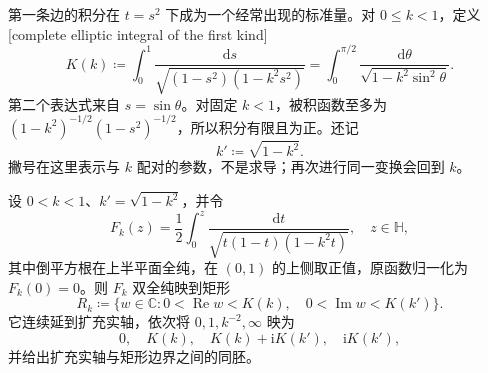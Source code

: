 第一条边的积分在 \(t=s^2\) 下成为一个经常出现的标准量。对 \(0\le k<1\)，定义[complete elliptic integral of the first kind]
\[
 K(k)\coloneqq\int_0^1
 \frac{\mathrm{d}s}{\sqrt{(1-s^2)(1-k^2s^2)}}
 =\int_0^{\pi/2}\frac{\mathrm{d}\theta}
 {\sqrt{1-k^2\sin^2\theta}}.
\]
第二个表达式来自 \(s=\sin\theta\)。对固定 \(k<1\)，被积函数至多为
\((1-k^2)^{-1/2}(1-s^2)^{-1/2}\)，所以积分有限且为正。还记
\[
 k'\coloneqq\sqrt{1-k^2}.
\]
撇号在这里表示与 \(k\) 配对的参数，不是求导；再次进行同一变换会回到 \(k\)。

\begin{proposition}[椭圆积分与矩形]\label{b3:prop:07-elliptic-rectangle}
设 \(0<k<1\)、\(k'=\sqrt{1-k^2}\)，并令
\[
 F_k(z)=\frac12\int_0^z
 \frac{\mathrm{d}t}{\sqrt{t(1-t)(1-k^2t)}},\quad z\in\mathbb H,
\]
其中倒平方根在上半平面全纯，在 \((0,1)\) 的上侧取正值，原函数归一化为 \(F_k(0)=0\)。则 \(F_k\) 双全纯映到矩形
\[
 R_k\coloneqq\{w\in\mathbb C:
 0<\operatorname{Re}w<K(k),\quad
 0<\operatorname{Im}w<K(k')\}.
\]
它连续延到扩充实轴，依次将 \(0,1,k^{-2},\infty\) 映为
\[
 0,\quad K(k),\quad K(k)+\mathrm{i}K(k'),\quad
 \mathrm{i}K(k'),
\]
并给出扩充实轴与矩形边界之间的同胚。
\end{proposition}
